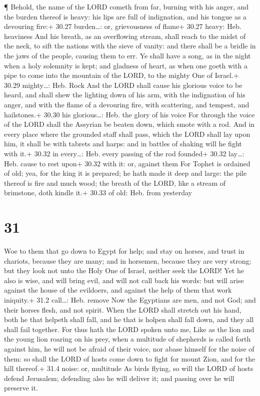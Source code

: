  ¶ Behold, the name of the LORD cometh from far, burning
with his anger, and the burden thereof is heavy: his lips are full of
indignation, and his tongue as a devouring fire:+ 30.27 burden\ldots:
or, grievousness of flame+ 30.27 heavy: Heb. heaviness  And
his breath, as an overflowing stream, shall reach to the midst of the
neck, to sift the nations with the sieve of vanity: and there shall be a
bridle in the jaws of the people, causing them to err.  Ye
shall have a song, as in the night when a holy solemnity is kept; and
gladness of heart, as when one goeth with a pipe to come into the
mountain of the LORD, to the mighty One of Israel.+ 30.29 mighty\ldots:
Heb. Rock  And the LORD shall cause his glorious voice to
be heard, and shall shew the lighting down of his arm, with the
indignation of his anger, and with the flame of a devouring fire, with
scattering, and tempest, and hailstones.+ 30.30 his glorious\ldots: Heb.
the glory of his voice  For through the voice of the LORD
shall the Assyrian be beaten down, which smote with a rod. 
And in every place where the grounded staff shall pass, which the LORD
shall lay upon him, it shall be with tabrets and harps: and in battles
of shaking will he fight with it.+ 30.32 in every\ldots: Heb. every
passing of the rod founded+ 30.32 lay\ldots: Heb. cause to rest upon+
30.32 with it: or, against them  For Tophet is ordained of
old; yea, for the king it is prepared; he hath made it deep and large:
the pile thereof is fire and much wood; the breath of the LORD, like a
stream of brimstone, doth kindle it.+ 30.33 of old: Heb. from yesterday

\hypertarget{section-30}{%
\section{31}\label{section-30}}

 Woe to them that go down to Egypt for help; and stay on
horses, and trust in chariots, because they are many; and in horsemen,
because they are very strong; but they look not unto the Holy One of
Israel, neither seek the LORD!  Yet he also is wise, and
will bring evil, and will not call back his words: but will arise
against the house of the evildoers, and against the help of them that
work iniquity.+ 31.2 call\ldots: Heb. remove  Now the
Egyptians are men, and not God; and their horses flesh, and not spirit.
When the LORD shall stretch out his hand, both he that helpeth shall
fall, and he that is holpen shall fall down, and they all shall fail
together.  For thus hath the LORD spoken unto me, Like as
the lion and the young lion roaring on his prey, when a multitude of
shepherds is called forth against him, he will not be afraid of their
voice, nor abase himself for the noise of them: so shall the LORD of
hosts come down to fight for mount Zion, and for the hill thereof.+ 31.4
noise: or, multitude  As birds flying, so will the LORD of
hosts defend Jerusalem; defending also he will deliver it; and passing
over he will preserve it.

